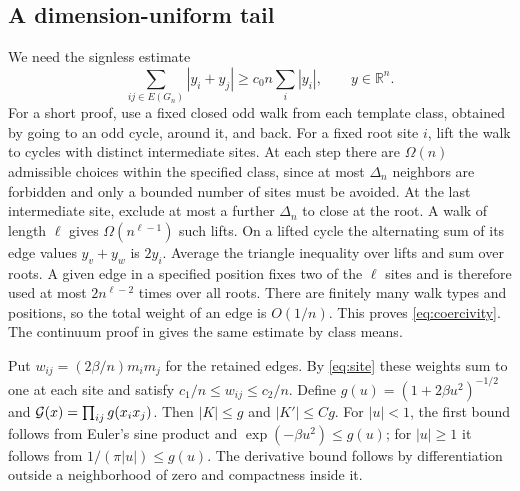 \subsection{A dimension-uniform tail}
We need the signless estimate
\begin{equation}
       \sum_{ij\in E(G_n)}|y_i+y_j|
                  \ge c_0 n\sum_i|y_i|,\qquad y\in\mathbb R^n .
 \label{eq:coercivity}
\end{equation}
For a short proof, use a fixed closed odd walk from each template class, obtained by going to an odd cycle, around it, and back. For a fixed root site \(i\), lift the walk to cycles with distinct intermediate sites. At each step there are \(\Omega(n)\) admissible choices within the specified class, since at most \(\Delta_n\) neighbors are forbidden and only a bounded number of sites must be avoided. At the last intermediate site, exclude at most a further \(\Delta_n\) to close at the root. A walk of length \(\ell\) gives \(\Omega(n^{\ell-1})\) such lifts. On a lifted cycle the alternating sum of its edge values \(y_v+y_w\) is \(2y_i\). Average the triangle inequality over lifts and sum over roots. A given edge in a specified position fixes two of the \(\ell\) sites and is therefore used at most \(2n^{\ell-2}\) times over all roots. There are finitely many walk types and positions, so the total weight of an edge is \(O(1/n)\). This proves \eqref{eq:coercivity}. The continuum proof in \cite{P50} gives the same estimate by class means.

Put \(w_{ij}=(2\beta/n)m_im_j\) for the retained edges. By \eqref{eq:site} these weights sum to one at each site and satisfy \(c_1/n\le w_{ij}\le c_2/n\). Define \(g(u)=(1+2\beta u^2)^{-1/2}\) and \({\cal G}(x)=\prod_{ij}g(x_i x_j)\). Then \(|K|\le g\) and \(|K'|\le Cg\). For \(|u|<1\), the first bound follows from Euler's sine product and \(\exp(-\beta u^2)\le g(u)\); for \(|u|\ge1\) it follows from \(1/(\pi |u|)\le g(u)\). The derivative bound follows by differentiation outside a neighborhood of zero and compactness inside it.

